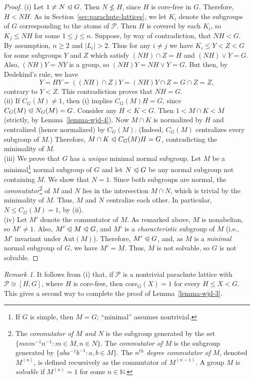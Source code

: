 \documentclass[cm,dissertation,actual,final]{uhthesis}
\theoremstyle{plain}
\theoremstyle{definition}
\theoremstyle{remark}
\newtheorem*{remark}{Remark}
\numberwithin{theorem}{section}
\numberwithin{claim}{chapter}
\numberwithin{equation}{section}
\numberwithin{conjecture}{chapter}
\newcommand{\<}{\ensuremath{\langle}}
\renewcommand{\>}{\ensuremath{\rangle}}
\renewcommand{\leq}{\ensuremath{\leqslant}}
\renewcommand{\nleq}{\ensuremath{\nleqslant}}
\renewcommand{\geq}{\ensuremath{\geqslant}}
\newcommand{\subnormal}{\ensuremath{\trianglelefteqslant}}
\newcommand{\join}{\ensuremath{\vee}}
\newcommand{\N}{\ensuremath{\mathbb{N}}}   %
\newcommand{\Aut}{\ensuremath{\mathrm{Aut}}}
\newcommand{\core}{\ensuremath{\mathrm{core}}}
\newcommand{\0}{\ensuremath{\mathbf{0}}}
\newcommand{\1}{\ensuremath{\mathbf{1}}}
\newcommand{\2}{\ensuremath{\mathbf{2}}}
\newcommand{\3}{\ensuremath{\mathbf{3}}}
\newcommand{\4}{\ensuremath{\mathbf{4}}}
\newcommand{\5}{\ensuremath{\mathbf{5}}}
\newcommand{\sP}{\ensuremath{\mathscr{P}}}
\begin{document}
\begin{proof}
(i) Let $1\neq N \subnormal G$.  Then $N \nleq H$, since $H$ is core-free in $G$.
Therefore, $H < NH$.   As in Section~\ref{sec:parachute-lattices}, we let $K_i$
denote the subgroups of $G$ 
corresponding to the atoms of $\sP$.  
Then $H$ is covered by each $K_i$, so $K_j\leq NH$ for some $1\leq j\leq n$.  
Suppose, by way of contradiction, that $NH < G$.  
By assumption, $n\geq 2$ and $|L_i|>2$.  Thus for any $i\neq j$ we have
$K_i\leq Y < Z < G$ for some subgroups $Y$ and $Z$ which satisfy
$(NH)\cap Z = H$ and $(NH)\join Y = G$.  Also, $(NH)Y = NY$ is a group, so
$(NH)Y=NH\join Y = G$.  But then, by Dedekind's rule, we have
\[
Y = HY = ((NH)\cap Z) Y = (NH)Y \cap Z = G\cap Z = Z,
\]
contrary to $Y<Z$.  This contradiction proves that $NH = G$.
\\[8pt]
%
(ii) If $C_G(M)\neq 1$, then (i) implies $C_G(M)H = G$,
since $C_G(M) \subnormal N_G(M) =G$. 
Consider any $H< K < G$. Then $1 < M\cap K < M$ (strictly, by
Lemma~\ref{lemma-wjd-4}). Now $M\cap K$ is normalized by $H$ and centralized
(hence normalized) by $C_G(M)$.  (Indeed, $C_G(M)$ centralizes every subgroup of
$M$.) Therefore, $M\cap K \subnormal C_G(M)H = G$, contradicting the minimality of
$M$. 
\\[8pt]
(iii) We prove that $G$ has a \emph{unique} minimal normal subgroup.  Let $M$ be a
minimal\footnote{If $G$ is simple, then $M = G$; ``minimal'' assumes
  nontrivial.} normal subgroup of $G$ and let $N \subnormal G$ be any normal subgroup not 
containing $M$.  We show that $N = 1$.  Since both subgroups
are normal, the \emph{commutator}\footnote{The \emph{commutator of $M$ and $N$} is the subgroup
generated by the set $\{mnm^{-1}n^{-1} : m\in M, n\in N\}.$
The \emph{commutator of $M$} is the subgroup generated by
 $\{a b a^{-1} b^{-1}: a, b \in M\}$.  The \emph{$n^{th}$ degree
commutator of $M$}, denoted $M^{(n)}$, is defined recursively as the commutator of
$M^{(n-1)}$. A group $M$ is \emph{solvable} if $M^{(n)} = 1$ for some $n \in \N$.}
 of $M$ and $N$ %
lies in the intersection $M\cap N$, which is trivial by the minimality of $M$.   
Thus, $M$ and $N$ centralize each other.  In particular,
$N \leq C_G(M) = 1$, by (ii).
\\[8pt]
(iv) Let $M'$ denote the commutator of $M$.   As remarked above, $M$ is
nonabelian, so $M' \neq 1$.  Also, $M' \subnormal M
\subnormal G$, and $M'$ is a \emph{characteristic} subgroup of $M$ (i.e.,
$M'$ invariant under $\Aut(M)$).  Therefore, $M'\subnormal G$, and, 
as $M$ is a \emph{minimal} normal subgroup of $G$, we have $M' = M$.  Thus, $M$ is
not solvable, so $G$ is not solvable.
\end{proof}
\begin{remark}
It follows from (i) that, if $\sP$ is a nontrivial parachute lattice
with $\sP \cong [H, G]$, where $H$ is core-free, then $\core_G(X) = 1$ for every $H
\leq X < G$.  This gives a second way to complete the proof of Lemma~\ref{lemma-wjd-3}.
\end{remark}
\end{document}
